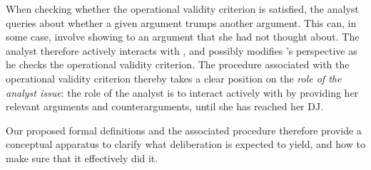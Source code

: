 \documentclass[a4paper, 11pt]{article}
\begin{document}
When checking whether the operational validity criterion is satisfied, the analyst queries \thedm{} about whether a given argument trumps another argument. This can, in some case, involve showing to \thedm{} an argument that she had not thought about. The analyst therefore actively interacts with \thedm, and possibly modifies \thedm’s perspective as he checks the operational validity criterion. 
The procedure associated with the operational validity criterion thereby takes a clear position on the \emph{role of the analyst issue}: the role of the analyst is to interact actively with \thedm{} by providing her relevant arguments and counterarguments, until she has reached her \ac{DJ}.

Our proposed formal definitions and the associated procedure therefore provide a conceptual apparatus to clarify what deliberation is expected to yield, and how to make sure that it effectively did it. 

\end{document}
